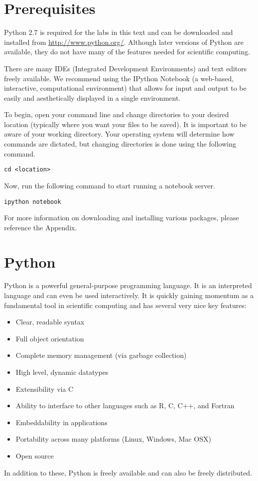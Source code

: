 \label{lab:Essential_Python}

\section*{Prerequisites}
Python 2.7 is required for the labs in this text and can be downloaded and 
installed from \url{http://www.python.org/}. Although later versions of 
Python are available, they do not have many of the features needed for scientific computing. 

There are many IDEs (Integrated Development Environments) and text editors freely 
available. We recommend using the IPython Notebook (a web-based, interactive, 
computational environment) that allows for input and output to be easily 
and aesthetically displayed in a single environment. 

To begin, open your command line and change directories to your desired location 
(typically where you want your files to be saved). It is important to be aware 
of your working directory. Your operating system will determine how commands are dictated, 
but changing directories is done using the following command.
\begin{lstlisting}
cd <location>
\end{lstlisting}
Now, run the following command to start running a notebook server.
\begin{lstlisting}
ipython notebook
\end{lstlisting}

For more information on downloading and installing various packages, please 
reference the Appendix. 


\section*{Python}
Python is a powerful general-purpose programming language. It is an interpreted
language and can even be used interactively. 
It is quickly gaining momentum as a fundamental tool in scientific computing and has several 
very nice key features:
\begin{itemize}
\item Clear, readable syntax
\item Full object orientation
\item Complete memory management (via garbage collection)
\item High level, dynamic datatypes
\item Extensibility via C
\item Ability to interface to other languages such as R, C, C++, and Fortran
\item Embeddability in applications
\item Portability across many platforms (Linux, Windows, Mac OSX)
\item Open source

\end{itemize}
In addition to these, Python is freely available and can also be freely distributed.

